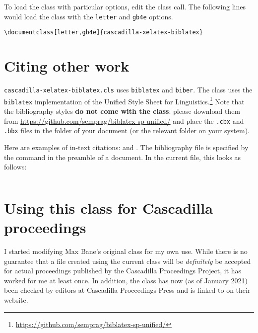 \documentclass{cascadilla-xelatex-biblatex}
\begin{document}
To load the class with particular options, edit the class call. The following
lines would load the class with the \texttt{letter} and \texttt{gb4e} options.

\begin{verbatim}
\documentclass[letter,gb4e]{cascadilla-xelatex-biblatex}
\end{verbatim}

\section{Citing other work}\label{sec:bib}

\texttt{cascadilla-xelatex-biblatex.cls} uses \texttt{biblatex} and
\texttt{biber}. The class uses the \texttt{biblatex} implementation of the
Unified Style Sheet for
Linguistics.\footnote{\url{https://github.com/semprag/biblatex-sp-unified/}}
Note that the bibliography styles \textbf{do not come with the class}: please
download them from \url{https://github.com/semprag/biblatex-sp-unified/} and
place the \texttt{.cbx} and \texttt{.bbx} files in the folder of your document
(or the relevant folder on your system).

Here are examples of in-text citations: \textcite{Yuan2021} and
\textcite{EKiss2008}. The bibliography file is specified by the
\verb++ command in the preamble of a document. In the
current file, this looks as follows:

\begin{verbatim}

\end{verbatim}

\section{Using this class for Cascadilla proceedings}

I started modifying Max Bane's original class for my own use. While there is no
guarantee that a file created using the current class will be \emph{definitely}
be accepted for actual proceedings published by the Cascadilla Proceedings
Project, it has worked for me at least once. In addition, the class has now (as
of January 2021) been checked by editors at Cascadilla Proceedings Press and is
linked to on their website.

\printbibliography
\end{document}
